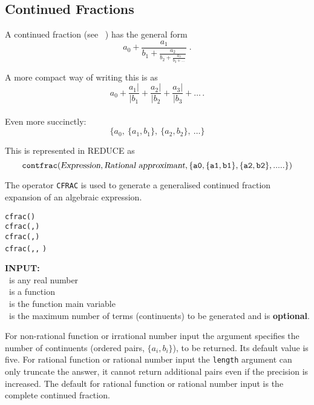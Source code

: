 %
%
%
\subsection{Continued Fractions}

A continued fraction (see ~\cite{JonesThron:80}) has the general form
{\Large
\[a_0 + \frac{a_1}{b_1 +
         \frac{a_2}{b_2+
          \frac{a_3}{b_3 + \ldots
        }}}
\;.\]
}

A more compact way of writing this is as
\[a_0 + \frac{a_1|}{|b_1} + \frac{a_2|}{|b_2} + \frac{a_3|}{|b_3} + \ldots\,.\]
\\
Even more succinctly:
\[\{a_0,\ \{a_1, b_1\},\ \{a_2, b_2\},\ \ldots\}\]

%
This is represented in {\small REDUCE} as
\[{\tt
  contfrac(\textsl{Expression},
    \textsl{Rational approximant},
                \{a0, \{a1,b1\}, \{a2,b2\},.....\})
}\]

\hypertarget{CFRAC:operator}{}
The operator \texttt{CFRAC} is used to generate a generalised continued
fraction expansion of an algebraic expression.\\
\begin{syntaxtable}
  \texttt{cfrac(}\texttt{)} \\
  \texttt{cfrac(}\texttt{,}\texttt{)}\\
  \texttt{cfrac(}\texttt{,}\texttt{)}\\
  \texttt{cfrac(}\texttt{,}\texttt{,}
  \texttt{)}
\end{syntaxtable}


\textbf{INPUT:}\\
 \ is any real number\\
 \ is a function\\
 \ is the function main variable\\
 \ is the maximum number of terms (continuents) to be
generated and is \textbf{optional}.

For non-rational function or irrational number input the 
argument specifies the number of continuents (ordered pairs, $\{a_i,b_i\}$),
to be returned. Its default value is five.
For rational function or rational number input the
\texttt{length} argument can only truncate the answer, it cannot
return additional pairs even if the precision is increased.
The default for rational function or rational number input is the
complete continued fraction.

